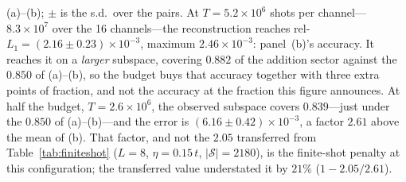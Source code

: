 {(a)--(b); $\pm$ is the s.d.\ over the pairs. At
$T=5.2\times10^{6}$ shots per channel---$8.3\times10^{7}$ over the 16 channels---the reconstruction
reaches rel-$L_1=(2.16\pm0.23)\times10^{-3}$, maximum $2.46\times10^{-3}$: panel~(b)'s accuracy. It
reaches it on a \emph{larger} subspace, covering $0.882$ of the addition sector against the $0.850$ of
(a)--(b), so the budget buys that accuracy together with three extra points of fraction, and not the
accuracy at the fraction this figure announces. At half the budget, $T=2.6\times10^{6}$, the observed
subspace covers $0.839$---just under the $0.850$ of (a)--(b)---and the error is
$(6.16\pm0.42)\times10^{-3}$, a factor $2.61$ above the mean of (b). That factor, and not the $2.05$
transferred from Table~\ref{tab:finiteshot} ($L=8$, $\eta=0.15\,t$, $|\mathcal S|=2180$), is the
finite-shot penalty at this configuration; the transferred value understated it by $21\%$
($1-2.05/2.61$).}
\label{fig:akwsampled}
